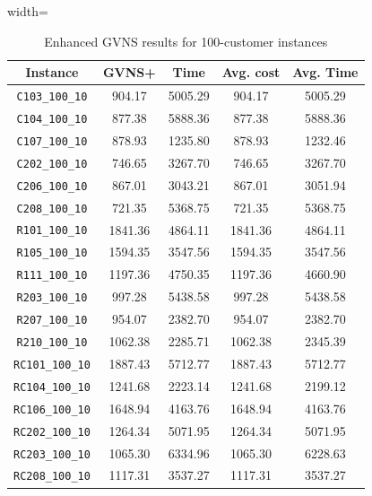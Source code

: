 \documentclass{article}
\begin{document}
\begin{table}[ht]
\centering
\small
\setlength{\tabcolsep}{4pt}
\caption{Enhanced GVNS results for 100-customer instances}
\vspace{4mm}
\begin{adjustbox}{width=\textwidth}
\begin{tabular}{c c c c c}
\toprule
Instance & GVNS+ & Time & Avg. cost & Avg. Time \\
\midrule
\texttt{C103\_100\_10} & 904.17 & 5005.29 & 904.17 & 5005.29 \\
\texttt{C104\_100\_10} & 877.38 & 5888.36 & 877.38 & 5888.36 \\
\texttt{C107\_100\_10} & 878.93 & 1235.80 & 878.93 & 1232.46 \\
\texttt{C202\_100\_10} & 746.65 & 3267.70 & 746.65 & 3267.70 \\
\texttt{C206\_100\_10} & 867.01 & 3043.21 & 867.01 & 3051.94 \\
\texttt{C208\_100\_10} & 721.35 & 5368.75 & 721.35 & 5368.75 \\
\texttt{R101\_100\_10} & 1841.36 & 4864.11 & 1841.36 & 4864.11 \\
\texttt{R105\_100\_10} & 1594.35 & 3547.56 & 1594.35 & 3547.56 \\
\texttt{R111\_100\_10} & 1197.36 & 4750.35 & 1197.36 & 4660.90 \\
\texttt{R203\_100\_10} & 997.28 & 5438.58 & 997.28 & 5438.58 \\
\texttt{R207\_100\_10} & 954.07 & 2382.70 & 954.07 & 2382.70 \\
\texttt{R210\_100\_10} & 1062.38 & 2285.71 & 1062.38 & 2345.39 \\
\texttt{RC101\_100\_10} & 1887.43 & 5712.77 & 1887.43 & 5712.77 \\
\texttt{RC104\_100\_10} & 1241.68 & 2223.14 & 1241.68 & 2199.12 \\
\texttt{RC106\_100\_10} & 1648.94 & 4163.76 & 1648.94 & 4163.76 \\
\texttt{RC202\_100\_10} & 1264.34 & 5071.95 & 1264.34 & 5071.95 \\
\texttt{RC203\_100\_10} & 1065.30 & 6334.96 & 1065.30 & 6228.63 \\
\texttt{RC208\_100\_10} & 1117.31 & 3537.27 & 1117.31 & 3537.27 \\
\bottomrule
\end{tabular}
\end{adjustbox}
\end{table}
\end{document}
